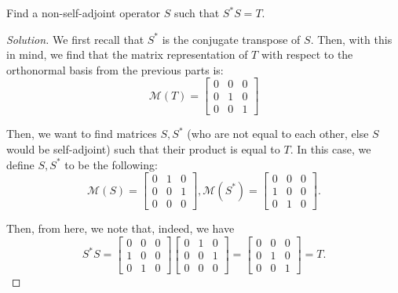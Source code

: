 \documentclass{article}
\newenvironment{solution}{\begin{proof}[Solution]}{\end{proof}}
\begin{document}
\begin{hw}
	Find a non-self-adjoint operator $S$ such that $S^{*}S = T$.
\end{hw}
\begin{solution}
	We first recall that $S^{*}$ is the conjugate transpose of $S$. Then, with this in mind, we find that the matrix representation of $T$ with respect to the orthonormal basis from the previous parts is:
	\begin{equation*}
		\mathcal{M}(T) = \begin{bmatrix}
			0 & 0 & 0 \\
			0 & 1 & 0 \\
			0 & 0 & 1
		\end{bmatrix}
	\end{equation*}

	Then, we want to find matrices $S, S^{*}$ (who are not equal to each other, else $S$ would be self-adjoint) such that their product is equal to $T$. In this case, we define $S, S^{*}$ to be the following:
	\begin{equation*}
		\mathcal{M}(S) = \begin{bmatrix}
			0 & 1 & 0 \\ 0 & 0 & 1 \\ 0 & 0 & 0
		\end{bmatrix}, \mathcal{M}(S^{*}) = \begin{bmatrix}
			0 & 0 & 0 \\
			1 & 0 & 0 \\
			0 & 1 & 0
		\end{bmatrix}.
	\end{equation*}

	Then, from here, we note that, indeed, we have
	\begin{equation*}
		S^{*}S = \begin{bmatrix}
			0 & 0 & 0 \\ 1 & 0 & 0 \\ 0 & 1 & 0
		\end{bmatrix} \begin{bmatrix}
		0 & 1 & 0 \\ 0 & 0 & 1 \\ 0 & 0 & 0
	\end{bmatrix} = \begin{bmatrix}
	 0 & 0 & 0 \\ 0 & 1 & 0 \\ 0 & 0 & 1
\end{bmatrix}
	= T.
	\end{equation*}
\end{solution}
\end{document}
